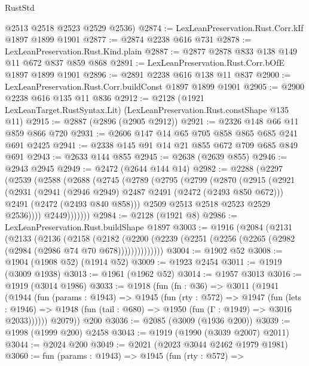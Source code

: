 \begin{lexlean}{RustStd}
\begin{coremodule}
      @2513
      @2518
      @2523
      @2529
      @2536)
@2874 := LexLeanPreservation.Rust.Corr.kIf @1897 @1899 @1901
@2877 := @2874 @2238 @616 @731
@2878 := LexLeanPreservation.Rust.Kind.plain
@2887 := @2877 @2878 @833 @138 @149 @11 @672 @837 @859 @868
@2891 := LexLeanPreservation.Rust.Corr.bOfE @1897 @1899 @1901
@2896 := @2891 @2238 @616 @138 @11 @837
@2900 := LexLeanPreservation.Rust.Corr.buildConst @1897 @1899 @1901
@2905 := @2900 @2238 @616 @135 @11 @836
@2912 := @2128 (@1921 LexLeanTarget.RustSyntax.Lit) (LexLeanPreservation.Rust.constShape @135 @11)
@2915 := @2887 (@2896 (@2905 @2912))
@2921 := @2326 @148 @66 @11 @859 @866 @720
@2931 := @2606 @147 @14 @65 @705 @858 @865 @685 @241 @691 @2425
@2941 := @2338 @145 @91 @14 @21 @855 @672 @709 @685 @849 @691
@2943 := @2633 @144 @855
@2945 := @2638 (@2639 @855)
@2946 := @2943 @2945
@2949 := @2472 (@2644 @144 @14)
@2982 := @2288
    (@2297
      (@2539
        (@2588
          (@2688
            (@2745
              (@2789
                (@2795
                  (@2799
                    (@2870
                      (@2915
                        (@2921
                          (@2931
                            (@2941 (@2946 @2949) @2487 @2491 (@2472 (@2493 @850 @672)))
                            @2491
                            (@2472 (@2493 @840 @858)))
                          @2509
                          @2513
                          @2518
                          @2523
                          @2529
                          @2536))))
                  @2449)))))))
@2984 := @2128 (@1921 @8)
@2986 := LexLeanPreservation.Rust.buildShape @1897
@3003 := @1916
    (@2084
      (@2131
        (@2133
          (@2136
            (@2158
              (@2182
                (@2200 (@2239 (@2251 (@2256 (@2265 (@2982 (@2984 (@2986 @74 @70 @678))))))))))))))
@3004 := @1902 @52
@3008 := @1904 (@1908 @52) (@1914 @52)
@3009 := @1923 @2454
@3011 := @1919 (@3009 @1938)
@3013 := @1961 (@1962 @52)
@3014 := @1957 @3013
@3016 := @1919 (@3014 @1986)
@3033 := @1918
    (fun (fn : @36) =>
    @3011
      (@1941
        (@1944
          (fun (params : @1943) =>
          @1945
            (fun (rty : @572) =>
            @1947
              (fun (lets : @1946) =>
              @1948 (fun (tail : @680) => @1950 (fun (Γ : @1949) => @3016 @2033))))))
        @2079))
    @200
@3036 := @2085 (@3009 (@1936 @200))
@3039 := @1998 (@1999 @200) @2458
@3043 := @1919 (@1990 (@3039 @2007) @2011)
@3044 := @2024 @200
@3049 := @2021 (@2023 @3044 @2462 @1979 @1981)
@3060 := fun (params : @1943) =>
  @1945
    (fun (rty : @572) =>

\end{coremodule}
\end{lexlean}
